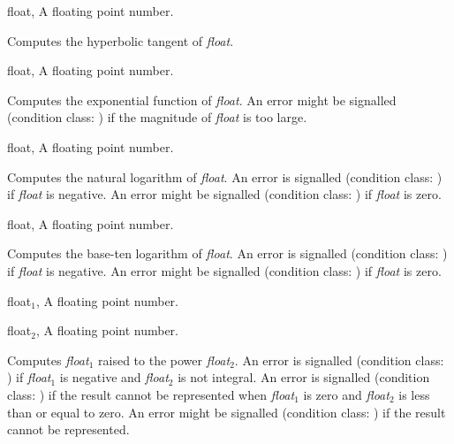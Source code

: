 \begin{optDefinition}
%
\begin{genericargs}
    \item[float, \classref{float}] A floating point number.
\end{genericargs}
%
\result%
Computes the hyperbolic tangent of {\em float}.

%
\begin{genericargs}
    \item[float, \classref{float}] A floating point number.
\end{genericargs}
%
\result%
Computes the exponential function of {\em float}.  An error might be signalled
(condition class:
) if the magnitude
of {\em float} is too large.

%
\begin{genericargs}
    \item[float, \classref{float}] A floating point number.
\end{genericargs}
%
\result%
Computes the natural logarithm of {\em float}.  An error is signalled (condition
class: ) if {\em
    float} is negative. An error might be signalled (condition class:
) if {\em float}
is zero.

%
\begin{genericargs}
    \item[float, \classref{float}] A floating point number.
\end{genericargs}
%
\result%
Computes the base-ten logarithm of {\em float}.  An error is signalled
(condition class:
) if {\em float}
is negative. An error might be signalled (condition class:
) if {\em float}
is zero.

%
\begin{genericargs}
    \item[float$_1$, \classref{float}] A floating point number.
    \item[float$_2$, \classref{float}] A floating point number.
\end{genericargs}
%
\result%
Computes {\em float$_1$} raised to the power {\em float$_2$}.  An error is
signalled (condition class:
) if {\em
    float$_1$} is negative and {\em float$_2$} is not integral.  An error is
signalled (condition class: ) if the result
cannot be represented when {\em float$_1$} is zero and {\em float$_2$} is less
than or equal to zero.  An error might be signalled (condition class:
) if the result
cannot be represented.


\end{optDefinition}
